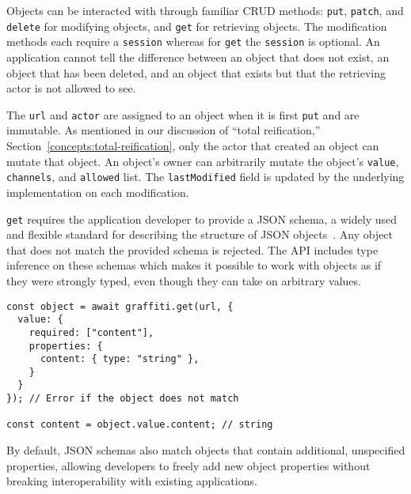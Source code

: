 Objects can be interacted with through familiar CRUD methods:
\texttt{put}, \texttt{patch}, and \texttt{delete} for modifying objects,
and \texttt{get} for retrieving objects.
The modification methods each require a \texttt{session} whereas
for \texttt{get} the \texttt{session} is optional.
An application cannot tell the difference between an object that does not exist,
an object that has been deleted, and an object that exists but that the retrieving actor
is not allowed to see.

The \texttt{url} and \texttt{actor} are assigned to an object when it is first \texttt{put}
and are immutable.
As mentioned in our discussion of ``total reification,'' Section~\ref{concepts:total-reification},
only the actor that created an object can mutate that object.
An object's owner can arbitrarily mutate the object's
\texttt{value}, \texttt{channels}, and \texttt{allowed} list.
The \texttt{lastModified} field is updated by the underlying implementation on each modification.

\texttt{get} requires the application developer to provide
a JSON schema, a widely used and flexible standard for describing
the structure of JSON objects~\cite{jsonschema}.
Any object that does not match the provided schema is rejected.
The API includes type inference on these schemas which makes it possible to work
with objects as if they were strongly typed, even though they can take on arbitrary values.

\begin{verbatim}
const object = await graffiti.get(url, {
  value: {
    required: ["content"],
    properties: {
      content: { type: "string" },
    }
  }
}); // Error if the object does not match

const content = object.value.content; // string
\end{verbatim}

By default, JSON schemas also match objects that contain additional,
unspecified properties, allowing developers to freely
add new object properties without breaking
interoperability with existing applications.





